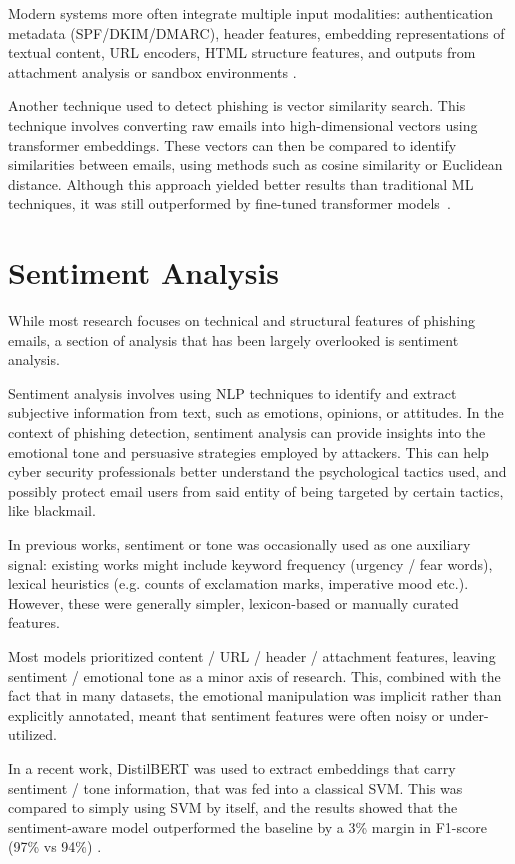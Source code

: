 Modern systems more often integrate multiple input modalities: authentication metadata (\ac{SPF}/\ac{DKIM}/\ac{DMARC}), header features, embedding representations of textual content, URL encoders, HTML structure features, and outputs from attachment analysis or sandbox environments \cite{PATRA2025110403, electronics12204261}.

Another technique used to detect phishing is vector similarity search. This technique involves converting raw emails into high-dimensional vectors using transformer embeddings. These vectors can then be compared to identify similarities between emails, using methods such as cosine similarity or Euclidean distance. Although this approach yielded better results than traditional \ac{ML} techniques, it was still outperformed by fine-tuned transformer models~\cite{PATRA2025110403}.

\section{Sentiment Analysis}

While most research focuses on technical and structural features of phishing emails, a section of analysis that has been largely overlooked is sentiment analysis.

Sentiment analysis involves using \ac{NLP} techniques to identify and extract subjective information from text, such as emotions, opinions, or attitudes. In the context of phishing detection, sentiment analysis can provide insights into the emotional tone and persuasive strategies employed by attackers. This can help cyber security professionals better understand the psychological tactics used, and possibly protect email users from said entity of being targeted by certain tactics, like blackmail.

In previous works, sentiment or tone was occasionally used as one auxiliary signal: existing works might include keyword frequency (urgency / fear words), lexical heuristics (e.g. counts of exclamation marks, imperative mood etc.). However, these were generally simpler, lexicon-based or manually curated features.

Most models prioritized content / URL / header / attachment features, leaving sentiment / emotional tone as a minor axis of research. This, combined with the fact that in many datasets, the emotional manipulation was implicit rather than explicitly annotated, meant that sentiment features were often noisy or under-utilized.

In a recent work, \ac{DistilBERT} was used to extract embeddings that carry sentiment / tone information, that was fed into a classical \ac{SVM}. This was compared to simply using \ac{SVM} by itself, and the results showed that the sentiment-aware model outperformed the baseline by a 3\% margin in F1-score (97\% vs 94\%) \cite{salian2024enhancing}.

